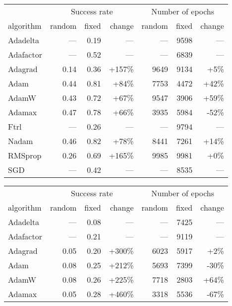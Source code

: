 \documentclass[letterpaper]{article} %
\begin{document}
\begin{table*}[t]
    \centering\fontsize{8}{9.6}\selectfont
    \begin{tabular}{lrrrrrr}
        \toprule
        & \multicolumn{3}{c}{Success rate} & \multicolumn{3}{c}{Number of epochs}
        \\\cmidrule(lr){2-4}\cmidrule(lr){5-7}
        algorithm & random & fixed & change & random & fixed & change
        \\\midrule
        Adadelta & --- & 0.19 & --- & --- & 9598 & ---
        \\
        Adafactor & --- & 0.52 & --- & --- & 6839 & ---
        \\
        Adagrad & 0.14 & 0.36 & +157\% & 9649 & 9134 & +5\%
        \\
        Adam & 0.44 & 0.81 & +84\% & 7753 & 4472 & +42\%
        \\
        AdamW & 0.43 & 0.72 & +67\% & 9547 & 3906 & +59\%
        \\
        Adamax & 0.47 & 0.78 & +66\% & 3935 & 5984 & -52\%
        \\
        Ftrl & --- & 0.26 & --- & --- & 9794 & ---
        \\
        Nadam & 0.46 & 0.82 & +78\% & 8441 & 7261 & +14\%
        \\
        RMSprop & 0.26 & 0.69 & +165\% & 9985 & 9981 & +0\%
        \\
        SGD & --- & 0.42 & --- & --- & 8535 & ---
        \\\bottomrule
    \end{tabular}
    \hfill
    \begin{tabular}{lrrrrrr}
        \toprule
        & \multicolumn{3}{c}{Success rate} & \multicolumn{3}{c}{Number of epochs}
        \\\cmidrule(lr){2-4}\cmidrule(lr){5-7}
        algorithm & random & fixed & change & random & fixed & change
        \\\midrule
        Adadelta & --- & 0.08 & --- & --- & 7425 & ---
        \\
        Adafactor & --- & 0.21 & --- & --- & 9119 & ---
        \\
        Adagrad & 0.05 & 0.20 & +300\% & 6023 & 5917 & +2\%
        \\
        Adam & 0.08 & 0.25 & +212\% & 5693 & 7399 & -30\%
        \\
        AdamW & 0.08 & 0.26 & +225\% & 7718 & 2803 & +64\%
        \\
        Adamax & 0.05 & 0.28 & +460\% & 3318 & 5536 & -67\%

\end{tabular}
\end{table*}
\end{document}
